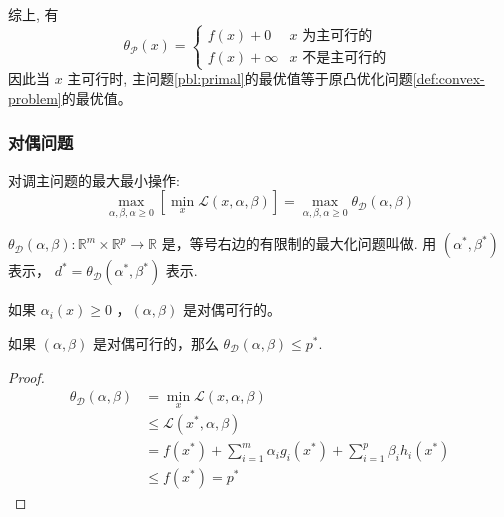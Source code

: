 综上, 有
$$
\theta_{\mathcal{P}}(x)=\left\{\begin{array}{ll}
f(x)+0 & x \text { 为主可行的 } \\
f(x)+\infty & x \text { 不是主可行的 }
\end{array}\right.
$$
因此当 $ x $ 主可行时, 主问题\ref{pbl:primal}的最优值等于原凸优化问题\ref{def:convex-problem}的最优值。

\subsubsection{对偶问题}

\begin{definition}[对偶问题]
    对调主问题的最大最小操作:
$$
\max _{\alpha, \beta, \alpha \geqslant 0}\left[\min _{x} \mathcal{L}(x, \alpha, \beta)\right]=\max _{\alpha, \beta, \alpha \geqslant 0} \theta_{\mathcal{D}}(\alpha, \beta)
$$

$ \theta_{\mathcal{D}}(\alpha, \beta): \mathbb{R}^{m} \times \mathbb{R}^{p} \rightarrow \mathbb{R} $ 是，等号右边的有限制的最大化问题叫做. 用 $ \left(\alpha^{*}, \beta^{*}\right) $ 表示， $ d^{*}=\theta_{\mathcal{D}}\left(\alpha^{*}, \beta^{*}\right) $ 表示.
\end{definition}

\begin{definition}[对偶可行]
    如果 $ \alpha_{i}(x) \geqslant 0 $ ，$ (\alpha, \beta) $ 是对偶可行的。
\end{definition}


\begin{theorem}
    如果 $ (\alpha, \beta) $ 是对偶可行的，那么 $ \theta_{\mathcal{D}}(\alpha, \beta) \leqslant p^{*} $.
\end{theorem}

\begin{proof}
    $$ \begin{aligned} \theta_{\mathcal{D}}(\alpha, \beta) &=\min _{x} \mathcal{L}(x, \alpha, \beta) \\ & \leqslant \mathcal{L}\left(x^{*}, \alpha, \beta\right) \\ &=f\left(x^{*}\right)+\sum_{i=1}^{m} \alpha_{i} g_{i}\left(x^{*}\right)+\sum_{i=1}^{p} \beta_{i} h_{i}\left(x^{*}\right) \\ & \leqslant f\left(x^{*}\right)=p^{*} \end{aligned} $$
\end{proof}

